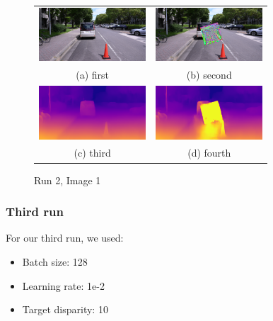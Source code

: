 \documentclass[conference]{IEEEtran}
\begin{document}
\begin{figure}
  \begin{tabular}{cc}
    \includegraphics[width=40mm]{./images/results/img1/Dst_checkpoints_result_epoch_929_patch/img_original.png} &   \includegraphics[width=40mm]{./images/results/img1/Dst_checkpoints_result_epoch_929_patch/img_attacked.png} \\
  (a) first & (b) second \\[6pt]
   \includegraphics[width=40mm]{./images/results/img1/Dst_checkpoints_result_epoch_929_patch/disp_original.png} &   \includegraphics[width=40mm]{./images/results/img1/Dst_checkpoints_result_epoch_929_patch/disp_attacked.png} \\
  (c) third & (d) fourth \\[6pt]
  \end{tabular}
  \caption{Run 2, Image 1}
  \end{figure}

\subsubsection{Third run}
For our third run, we used:
\begin{itemize}
  \item Batch size: 128
  \item Learning rate: 1e-2
  \item Target disparity: 10
\end{itemize}
\end{document}
